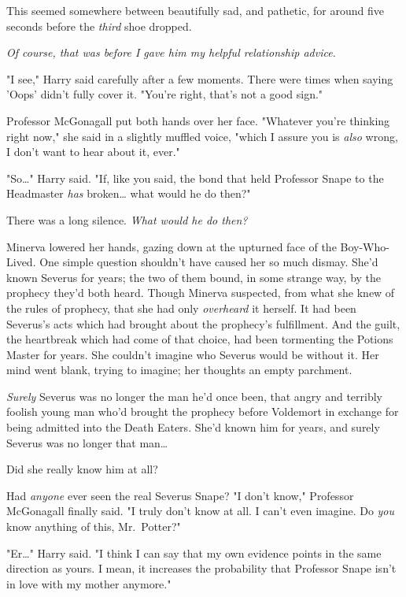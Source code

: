 This seemed somewhere between beautifully sad, and pathetic, for around five seconds before the \emph{third} shoe dropped.

\emph{Of course, that was before I gave him my helpful relationship advice.}

"I see," Harry said carefully after a few moments. There were times when saying 'Oops' didn't fully cover it. "You're right, that's not a good sign."

Professor McGonagall put both hands over her face. "Whatever you're thinking right now," she said in a slightly muffled voice, "which I assure you is \emph{also} wrong, I don't want to hear about it, ever."

"So{\ldots}" Harry said. "If, like you said, the bond that held Professor Snape to the Headmaster \emph{has} broken{\ldots} what would he do then?"

There was a long silence.
\sbreak
\emph{What would he do then?}

Minerva lowered her hands, gazing down at the upturned face of the Boy-Who-Lived. One simple question shouldn't have caused her so much dismay. She'd known Severus for years; the two of them bound, in some strange way, by the prophecy they'd both heard. Though Minerva suspected, from what she knew of the rules of prophecy, that she had only \emph{overheard} it herself. It had been Severus's acts which had brought about the prophecy's fulfillment. And the guilt, the heartbreak which had come of that choice, had been tormenting the Potions Master for years. She couldn't imagine who Severus would be without it. Her mind went blank, trying to imagine; her thoughts an empty parchment.

\emph{Surely} Severus was no longer the man he'd once been, that angry and terribly foolish young man who'd brought the prophecy before Voldemort in exchange for being admitted into the Death Eaters. She'd known him for years, and surely Severus was no longer that man{\ldots}

Did she really know him at all?

Had \emph{anyone} ever seen the real Severus Snape?
\sbreak
"I don't know," Professor McGonagall finally said. "I truly don't know at all. I can't even imagine. Do \emph{you} know anything of this, Mr.~Potter?"

"Er{\ldots}" Harry said. "I think I can say that my own evidence points in the same direction as yours. I mean, it increases the probability that Professor Snape isn't in love with my mother anymore."

